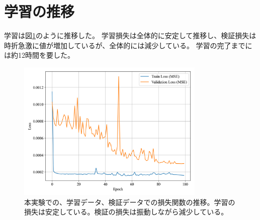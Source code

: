   \section{学習の推移}
    学習は図\ref{fig:exp1_learn_progress}のように推移した。
    学習損失は全体的に安定して推移し、検証損失は時折急激に値が増加しているが、全体的には減少している。
    学習の完了までには約12時間を要した。
    \begin{figure}[htbp]
      \centering
      \includegraphics[width=0.8\textwidth]{figures/exp1/loss.png}
      \caption{本実験での、学習データ、検証データでの損失関数の推移。学習の損失は安定している。検証の損失は振動しながら減少している。}
      \label{fig:exp1_learn_progress}
    \end{figure}


